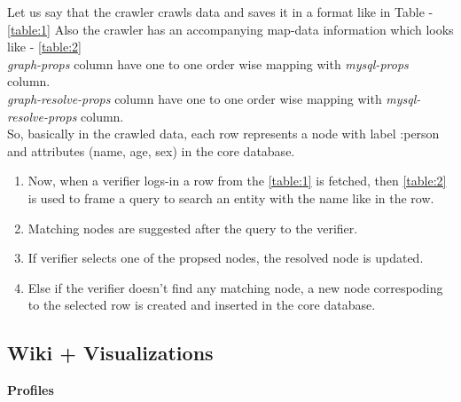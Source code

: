 \begin{table}
\centering
{}
\caption{Sample record of Crawled-Core-map database}
\label{table:2}
\end{table}

Let us say that the crawler crawls data and saves it in a format like in Table - \ref{table:1}
Also the crawler has an accompanying map-data information which looks like - \ref{table:2}\\
\emph{graph-props} column have one to one order wise mapping with \emph{mysql-props} column.\\
\emph{graph-resolve-props} column have one to one order wise mapping with \emph{mysql-resolve-props} column.\\

So, basically in the crawled data, each row represents a node with label :person and attributes (name, age, sex) in the core database.\\

\begin{enumerate}
\item Now, when a verifier logs-in a row from the \ref{table:1} is fetched, then \ref{table:2} is used to frame a query to search an entity with the name like in the row.
\item Matching nodes are suggested after the query to the verifier.
\item If verifier selects one of the propsed nodes, the resolved node is updated.
\item Else if the verifier doesn't find any matching node, a new node correspoding to the selected row is created and inserted in the core database.
\end{enumerate}

\subsection{\textbf{Wiki + Visualizations }}

\textbf{Profiles}\\

